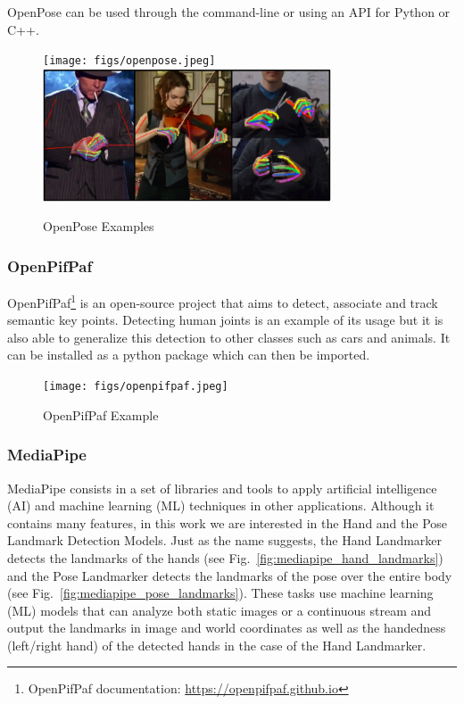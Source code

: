 OpenPose can be used through the command-line or using an API for Python or C++.

\begin{figure}[h]
\centerline{\texttt{[image: figs/openpose.jpeg]}\includegraphics[height=1.55in]{figs/openpose2.PNG}}
\caption[OpenPose Examples]{OpenPose Examples \cite{Cao2021,Simon2017}}
\label{openpose}
\end{figure}

\subsubsection{OpenPifPaf}

OpenPifPaf\cite{Kreiss2021,Kreiss2019}\footnote{OpenPifPaf documentation: \url{https://openpifpaf.github.io}} is an open-source project that aims to detect, associate and track semantic key points. Detecting human joints is an example of its usage but it is also able to generalize this detection to other classes such as cars and animals. It can be installed as a python package which can then be imported.

\begin{figure}[h]
\centerline{\texttt{[image: figs/openpifpaf.jpeg]}}
\caption[OpenPifPaf Example]{OpenPifPaf Example \cite{Kreiss2021}}
\label{openpifpaf}
\end{figure}

\subsubsection{MediaPipe}

MediaPipe consists in a set of libraries and tools to apply artificial intelligence (AI) and machine learning (ML) techniques in other applications. Although it contains many features, in this work we are interested in the Hand and the Pose Landmark Detection Models. Just as the name suggests, the Hand Landmarker detects the landmarks of the hands (see Fig.~\ref{fig:mediapipe_hand_landmarks}) and the Pose Landmarker detects the landmarks of the pose over the entire body (see Fig.~\ref{fig:mediapipe_pose_landmarks}). These tasks use machine learning (ML) models that can analyze both static images or a continuous stream and output the landmarks in image and world coordinates as well as the handedness (left/right hand) of the detected hands in the case of the Hand Landmarker.

